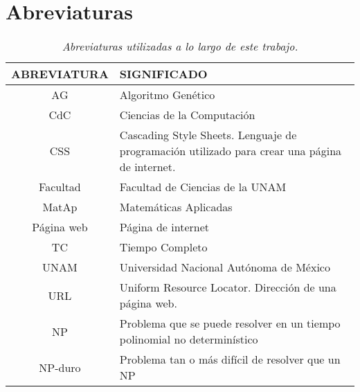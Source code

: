 \section{Abreviaturas}

\begin{table}[H]
\centering
\begin{tabular}{|c|p{10cm}|}
\hline 
 \textbf{ABREVIATURA} & \textbf{SIGNIFICADO} \\ 
\hline 
 AG & Algoritmo Genético \\ 
\hline 
 CdC & Ciencias de la Computación \\ 
\hline 
 CSS & Cascading Style Sheets. Lenguaje de programación utilizado para crear una página de internet. \\ 
\hline 
 Facultad & Facultad de Ciencias de la UNAM \\ 
\hline 
 MatAp & Matemáticas Aplicadas \\ 
 \hline 
 Página web & Página de internet \\ 
\hline 
 TC & Tiempo Completo \\ 
\hline 
 UNAM & Universidad Nacional Autónoma de México \\ 
\hline 
 URL & Uniform Resource Locator. Dirección de una página web. \\
\hline 
 NP & Problema que se puede resolver en un tiempo polinomial no determinístico \\ %
\hline 
 NP-duro & Problema tan o más difícil de resolver que un NP \\ %
\hline 
\end{tabular} 
\caption[\textit{Abreviaturas}]{\textit{Abreviaturas utilizadas a lo largo de este trabajo.}}
\end{table}
